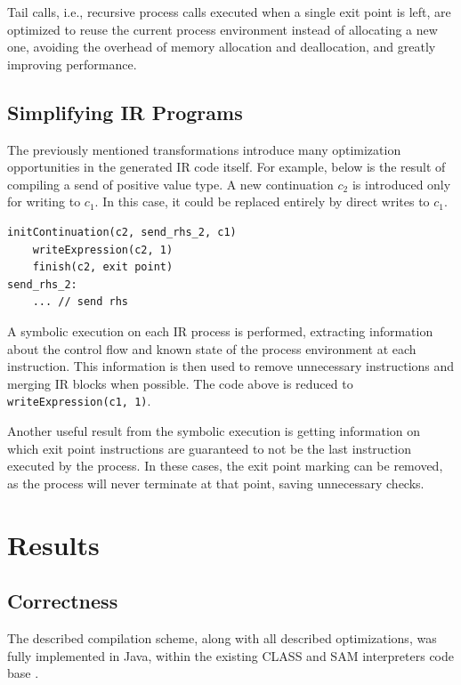 \documentclass[sigconf,nonacm,natbib=true]{acmart}
\begin{document}
Tail calls, i.e., recursive process calls executed when a single exit point is left, are optimized to reuse the current process environment instead of allocating a new one, avoiding the overhead of memory allocation and deallocation, and greatly improving performance.

\subsection{Simplifying IR Programs}

The previously mentioned transformations introduce many optimization opportunities in the generated \ac{IR} code itself. For example, below is the result of compiling a send of positive value type. A new continuation $c_2$ is introduced only for writing to $c_1$. In this case, it could be replaced entirely by direct writes to $c_1$.

\begin{lstlisting}[language=IR, frame=bottom]
    initContinuation(c2, send_rhs_2, c1)
    writeExpression(c2, 1)
    finish(c2, exit point)
send_rhs_2:
    ... // send rhs
\end{lstlisting}

A symbolic execution on each \ac{IR} process is performed, extracting information about the control flow and known state of the process environment at each instruction. This information is then used to remove unnecessary instructions and merging \ac{IR} blocks when possible. The code above is reduced to \texttt{writeExpression(c1, 1)}.

Another useful result from the symbolic execution is getting information on which exit point instructions are guaranteed to not be the last instruction executed by the process. In these cases, the exit point marking can be removed, as the process will never terminate at that point, saving unnecessary checks.

\section{Results}

\subsection{Correctness}

The described compilation scheme, along with all described optimizations, was fully implemented in Java, within the existing \ac{CLASS} and \ac{SAM} interpreters code base \citep{Rocha:2021:artifact,Caires:2024:artifact}.
\end{document}
